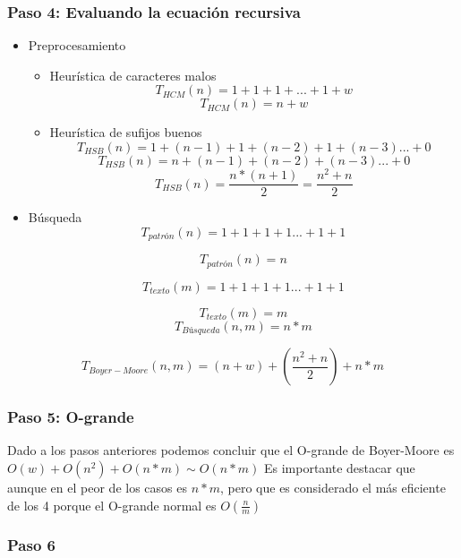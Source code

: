 \subsubsection*{Paso 4: Evaluando la ecuación recursiva}
\begin{itemize}
    \item Preprocesamiento
    \begin{itemize}
        \item Heurística de caracteres malos
        \[T_{HCM}(n) = 1 + 1+ 1+ ... + 1 + w\]
        \[T_{HCM}(n) = n + w\]
        \item Heurística de sufijos buenos
        \[T_{HSB}(n) = 1 +  (n-1) + 1 + (n-2) + 1 + (n-3) ... + 0\]
        \[T_{HSB}(n) = n + (n-1) + (n-2) + (n-3) ... + 0\]
        \[T_{HSB}(n) = \frac{n*(n+1)}{2} = \frac{n^2 + n}{2}\]
    \end{itemize}
    \item Búsqueda
    \[T_{patrón}(n) = 1 + 1 + 1 + 1 ... + 1 + 1\]

    \[T_{patrón}(n) = n \]

    \[T_{texto}(m) = 1 + 1 + 1 + 1 ... + 1 + 1\]

    \[T_{texto}(m) = m \]
    \[T_{Búsqueda}(n,m) = n * m\]
\end{itemize}

\[T_{Boyer-Moore}(n,m) = (n+w) + (\frac{n^2 + n}{2}) + n*m\]

\subsubsection*{Paso 5: O-grande}
Dado a los pasos anteriores podemos concluir que el O-grande de Boyer-Moore es $O(w) + O(n^2) + O(n*m) \sim O(n*m)$
Es importante destacar que aunque en el peor de los casos es $n*m$, pero que es considerado el más eficiente de los 4 porque el O-grande normal es $O(\frac{n}{m})$
\subsubsection*{Paso 6}


